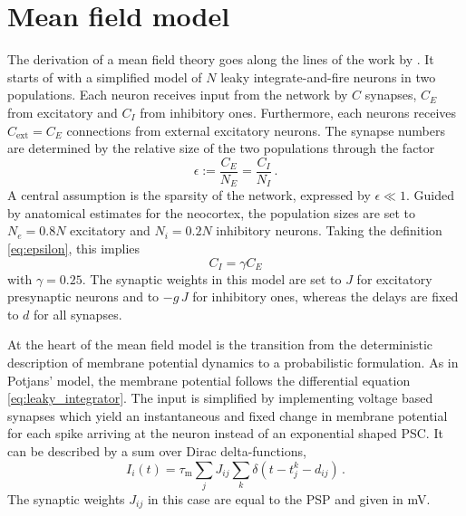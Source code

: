 \FloatBarrier
\section{Mean field model}
The derivation of a mean field theory goes along the 
lines of the work by .
It starts of with a simplified model of 
$N$ leaky integrate-and-fire neurons in two populations. 
Each neuron receives input from the network by $C$ synapses, 
$C_E$ from excitatory and $C_I$ from inhibitory ones. 
Furthermore, each neurons receives $C_\text{ext} = C_E$ connections from 
external excitatory neurons.
The synapse numbers 
are determined by the relative size of the two populations through the factor
\begin{equation}
    \epsilon := \frac{C_E}{N_E} = \frac{C_I}{N_I} \,.
    \label{eq:epsilon}
\end{equation}
A central assumption is the sparsity of the network, expressed by $\epsilon \ll 1$.
Guided by anatomical estimates for the neocortex, the population sizes are set to
$N_e = 0.8N$ excitatory and $N_i = 0.2N$ inhibitory neurons. Taking the definition
\eqref{eq:epsilon}, this implies 
\begin{equation}
    C_I = \gamma C_E 	
 \label{eq:C_I}
\end{equation}
with $\gamma = 0.25$. The synaptic weights in this model are set to $J$ for 
excitatory presynaptic neurons and to $-g\, J$ for inhibitory ones, 
whereas the delays are fixed to $d$ for all synapses. 

At the heart of the mean field model
is the transition from the deterministic description of membrane potential 
dynamics to a probabilistic formulation. 
As in Potjans' model, the membrane potential follows
the differential equation \eqref{eq:leaky_integrator}. The input is simplified 
by implementing voltage based synapses which
yield an instantaneous and fixed change in membrane potential
for each spike arriving at the neuron instead of an exponential shaped PSC.
It can be described by a sum over Dirac delta-functions, 
\begin{equation}
    I_i(t) = \tau_\text{m} \sum_j J_{ij} \sum_k \delta(t - t_j^k - d_{ij}) \,.
    \label{eq:input_const_volt}
\end{equation}
The synaptic weights $J_{ij}$ in this case are equal to the PSP and given in mV.  

